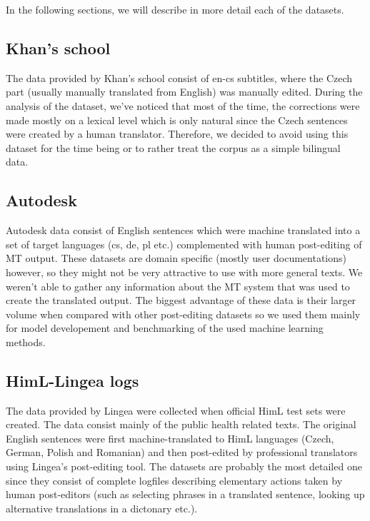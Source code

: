 In the following sections, we will describe in more detail each of the datasets.

\subsection{Khan's school}

The data provided by Khan's school consist of en-cs subtitles,
where the Czech part (usually manually translated from English) was manually
edited. During the analysis of the dataset,
we've noticed that most of the time, the corrections were made
mostly on a lexical level which is only natural since the Czech sentences
were created by a human translator.
Therefore, we decided to avoid using this dataset for the time being or to
rather treat the corpus as a simple bilingual data.

\subsection{Autodesk}

Autodesk data consist of English sentences which were machine translated into
a set of target languages (cs, de, pl etc.) complemented with human post-editing
of MT output. These datasets are domain specific (mostly user documentations)
however, so they might not be very attractive to use with more general texts.
We weren't able to gather any information about the MT system that was used
to create the translated output. The biggest advantage of these data is
their larger volume when compared with other post-editing datasets so we
used them mainly for model developement and benchmarking of the used machine
learning methods.

\subsection{HimL-Lingea logs}

The data provided by Lingea were collected when official HimL test sets were
created. The data consist mainly of the public health related texts.
The original English sentences were first
machine-translated to HimL languages (Czech, German, Polish and Romanian)
and then post-edited by professional
translators using Lingea's post-editing tool. The datasets are probably the most
detailed one since they consist of complete logfiles
describing elementary actions taken by human post-editors (such as selecting
phrases in a translated sentence, looking up alternative translations
in a dictonary etc.).

